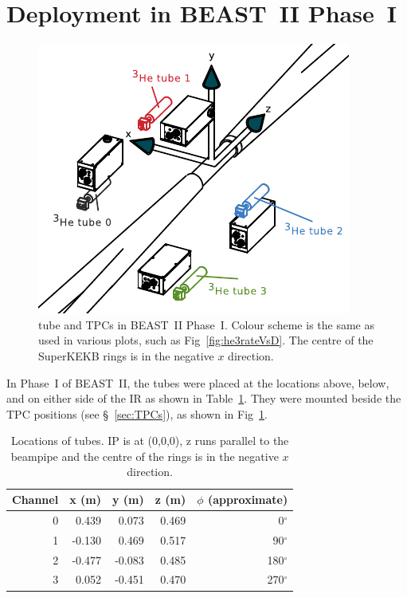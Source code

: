 

\section{Deployment in BEAST~II Phase~I}



\begin{figure}[htb]
	\centerfloat
		\includegraphics[width=\textwidth]{images/he3tubesAndTPCs}		
	\caption[\He tube and TPCs in BEAST~II Phase~I]{\He tube and TPCs in BEAST~II Phase~I. Colour scheme is the same as used in various plots, such as Fig~\ref{fig:he3rateVsD}. The centre of the SuperKEKB rings is in the negative $x$ direction.}
    \label{fig:He3InSitu}
\end{figure}

In Phase~I of BEAST~II, the \he tubes were placed at the locations above, below, and on either side of the IR as shown in Table~\ref{tab:he3Loc}. They were mounted beside the TPC positions (see \S~\ref{sec:TPCs}), as shown in Fig~\ref{fig:He3InSitu}.



\begin{table}[htb]
	\centering
	\begin{tabular}{ rrrrr }
	Channel	&	x (m)	&	y (m)	&	z (m)	&	$\phi$ (approximate)	\\ \hline \hline
	0	&	0.439	&	0.073	&	0.469	&	0$^{\circ}$	\\
	1	&	-0.130	&	0.469	&	0.517	&	90$^{\circ}$	\\
	2	&	-0.477	&	-0.083	&	0.485	&	180$^{\circ}$	\\
	3	&	0.052	&	-0.451	&	0.470	&	270$^{\circ}$	\\ \hline
	\end{tabular}
	\caption[Locations of \he tubes]{Locations of \he tubes. IP is at (0,0,0), z runs parallel to the beampipe and the centre of the rings is in the negative $x$ direction.}
	\label{tab:he3Loc}
\end{table}



